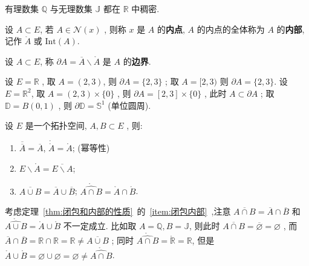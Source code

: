 \documentclass[lang=cn,10pt]{gorgeousnbook}
\numberwithin{equation}{section}%
\numberwithin{figure}{section}%
\begin{document}
\begin{exercise}
   有理数集 $ \mathbb{Q} $ 与无理数集 $ \mathbb{J} $ 都在 $\mathbb{R}$ 中稠密.
\end{exercise}
\begin{definition}[内部]\label{def:内部}
   设 $ A\subset E $, 若 $ A\in\mathcal{N}(x) $ , 则称 $ x $ 是 $ A $ 的\textbf{内点},  $ A $ 的内点的全体称为 $ A $ 的\textbf{内部}, 记作 $ \mathring{A} $ 或 $ \mathrm{Int}(A) $.
\end{definition}
\begin{definition}[边界]\label{def:边界}
   设 $ A\subset E $, 称 $ \partial A = \overline{A}\backslash\mathring{A} $ 是 $ A $ 的\textbf{边界}.
\end{definition}
\begin{exercise}
   设 $ E=\mathbb{R} $ , 取 $ A = (2, 3) $, 则 $ \partial A = \{ 2, 3 \} $ ; 取 $ A = [2, 3) $ 则 $ \partial A = \{ 2, 3 \} $.
   设 $ E = \mathbb{R}^{2} $, 取 $ A = (2, 3)\times \{0\} $ , 则 $ \partial A = [2, 3]\times \{0\} $ , 此时 $ A\subset \partial A $  ; 取 $ \mathbb{D}=B(0, 1) $ , 则 $ \partial \mathbb{D}=\mathbb{S}^{1} $ (单位圆周).
\end{exercise}
\begin{theorem}\label{thm:闭包和内部的性质}
设 $ E $ 是一个拓扑空间, $ A, B\subset E $ , 则:
\begin{enumerate}[(1)]
  \item $ \overline{\overline{A}}=\overline{A} $, $ \mathring{\mathring{A}}=\mathring{A} $; (幂等性)
  \item $ E\backslash\mathring{A}=\overline{E\backslash A} $;
  \item \label{item:闭包内部}$\overline {A\cup B}=\overline{A}\cup \overline{B} $; $ \mathring{\widehat{A\cap B}}=\mathring{A}\cap\mathring{B} $.
\end{enumerate}
\end{theorem}

\begin{remark}
考虑定理~\ref{thm:闭包和内部的性质}~的~\ref{item:闭包内部}~,注意 $ \overline {A\cap B}=\overline{A}\cap \overline{B} $ 和 $ \mathring{\widehat{A\cup B}}=\mathring{A}\cup\mathring{B} $ 不一定成立. 比如取 $ A=\mathbb{Q}, B=\mathbb{J} $, 则此时 $ \overline{A\cap B}=\overline{\varnothing}=\varnothing $  , 而 $ \overline{A}\cap \overline{B}=\mathbb{R}\cap \mathbb{R}=\mathbb{R} \neq\overline {A\cup B} $ ; 同时 $ \mathring{\widehat{A\cap B}}=\mathring{\mathbb{R}}=\mathbb{R} $, 但是 $ \mathring{A}\cup\mathring{B}=\varnothing\cup\varnothing=\varnothing\neq \mathring{\widehat{A\cap B}} $.
\end{remark}
\end{document}
